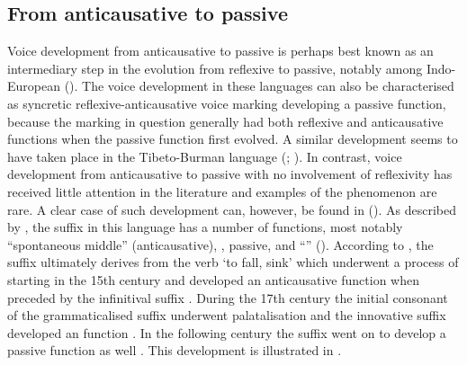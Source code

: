 \subsection{From anticausative to passive} \label{diachrony:antc2pass}
Voice development from anticausative to passive is perhaps best known as an intermediary step in the evolution from reflexive to passive, notably among Indo-European (). The voice development in these languages can also be characterised as syncretic reflexive-anticausative voice marking developing a passive function, because the marking in question generally had both reflexive and anticausative functions when the passive function first evolved. A similar development seems to have taken place in the Tibeto-Burman language  (; ). In contrast, voice development from anticausative to passive with no involvement of reflexivity has received little attention in the literature and examples of the phenomenon are rare. A clear case of such development can, however, be found in  (). As described by \citet{ahn:yap:2017}, the suffix  in this language has a number of functions, most notably “spontaneous middle” (anticausative), , passive, and “” (). According to \citet[444ff.]{ahn:yap:2017}, the suffix ultimately derives from the verb  ‘to fall, sink’ which underwent a process of  starting in the 15th century and developed an anticausative function when preceded by the infinitival suffix . During the 17th century the initial consonant of the grammaticalised suffix  underwent palatalisation and the innovative suffix  developed an  function \citep[446ff.]{ahn:yap:2017}. In the following century the suffix went on to develop a passive function as well \citep[451ff.]{ahn:yap:2017}. This development is illustrated in . 

